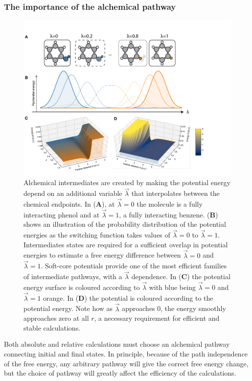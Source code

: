 \documentclass[9pt,bestpractices]{livecoms}
\begin{document}
\subsubsection{The importance of the alchemical pathway
\label{sec:important_path}}
\begin{figure}
    \includegraphics[width=0.95\linewidth]{figures/fig7_what_is_lam/Figure.pdf}
    \caption{Alchemical intermediates are created by making the potential energy depend on an additional variable $\vec{\lambda}$ that interpolates between the chemical endpoints. In (\textbf{A}), at $\vec{\lambda}=0$ the molecule is a fully interacting phenol and at $\vec{\lambda}=1$,  a fully interacting benzene. (\textbf{B}) shows an illustration of the probability distribution of the potential energies as the switching function takes values of $\vec{\lambda}=0$ to $\vec{\lambda}=1$. Intermediates states are required for a sufficient overlap in potential energies to estimate a free energy difference between $\vec{\lambda}=0$ and $\vec{\lambda}=1$.
    Soft-core potentials provide one of the most efficient families of intermediate pathways, with a $\vec{\lambda}$ dependence. In (\textbf{C}) the potential energy surface is coloured according to $\vec{\lambda}$ with blue being $\vec{\lambda}=0$ and $\vec{\lambda}=1$ orange. In (\textbf{D}) the potential is coloured according to the potential energy. Note how as $\vec{\lambda}$ approaches 0, the energy smoothly approaches zero at all $r$, a necessary requirement for efficient and stable calculations.  }
    \label{fig:fig_what_is_lambda}
\end{figure}

Both absolute and relative calculations must choose an alchemical pathway connecting initial and final states. In principle, because of the path independence of the free energy, any arbitrary pathway will give the correct free energy change, but the choice of pathway will greatly affect the efficiency of the calculations. 
\end{document}
